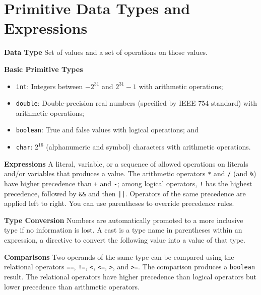 \documentclass[8pt,a4paper,compress]{beamer}
\begin{document}
\section{Primitive Data Types and Expressions}
\begin{frame}[fragile]
\pause

\textbf{Data Type} Set of values and a set of operations on those values.

\pause
\smallskip

\textbf{Basic Primitive Types}
\begin{itemize}
\item \lstinline$int$: Integers between $-2^{31}$ and $2^{31}-1$ with arithmetic operations; 
\item \lstinline$double$: Double-precision real numbers (specified by IEEE 754 standard) with arithmetic operations; 
\item \lstinline$boolean$: True and false values with logical operations; and
\item \lstinline$char$: $2^{16}$ (alphanumeric and symbol) characters with arithmetic operations.
\end{itemize}

\pause
\smallskip

\textbf{Expressions} A literal, variable, or a sequence of allowed operations on literals and/or variables that produces a value. The arithmetic operators \lstinline$*$ and \lstinline$/$ (and \lstinline$%$) have higher precedence than \lstinline$+$ and \lstinline$-$; among logical operators, \lstinline$!$ has the highest precedence, followed by \lstinline$&&$ and then \lstinline$||$. Operators of the same precedence are applied left to right. You can use parentheses to override precedence rules.

\pause
\smallskip

\textbf{Type Conversion} Numbers are automatically promoted to a more inclusive type if no information is lost. A cast is a type name in parentheses within an expression, a directive to convert the following value into a value of that type.

\pause
\smallskip

\textbf{Comparisons} Two operands of the same type can be compared using the relational operators \lstinline$==$, \lstinline$!=$, \lstinline$<$, \lstinline$<=$, \lstinline$>$, and \lstinline$>=$. The comparison produces a \lstinline$boolean$ result. The relational operators have higher precedence than logical operators but lower precedence than arithmetic operators.


\end{frame}
\end{document}
